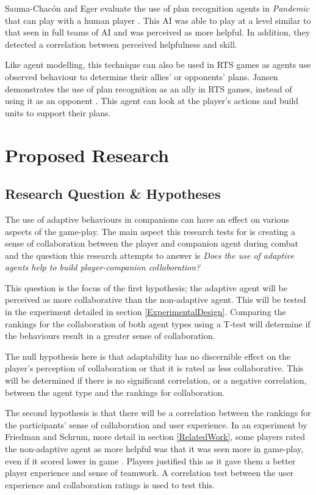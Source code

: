 \documentclass{IEEEtran}
\begin{document}
Sauma-Chacón and Eger evaluate the use of plan recognition agents in \textit{Pandemic} that can play with a human player \cite{PandemicPlanRecognition2021}. This AI was able to play at a level similar to that seen in full teams of AI and was perceived as more helpful. In addition, they detected a correlation between perceived helpfulness and skill.

Like agent modelling, this technique can also be used in RTS games as agents use observed behaviour to determine their allies' or opponents' plans. Jansen demonstrates the use of plan recognition as an ally in RTS games, instead of using it as an opponent \cite{PlayerAdaptiveRTSAI2007}. This agent can look at the player's actions and build units to support their plans.

\section{Proposed Research}
\label{ProposedResearch}

\subsection{Research Question \& Hypotheses}
\label{Hypotheses}

The use of adaptive behaviours in companions can have an effect on various aspects of the game-play. The main aspect this research tests for is creating a sense of collaboration between the player and companion agent during combat and the question this research attempts to answer is \textit{Does the use of adaptive agents help to build player-companion collaboration?}

This question is the focus of the first hypothesis; the adaptive agent will be perceived as more collaborative than the non-adaptive agent. This will be tested in the experiment detailed in section \ref{ExperimentalDesign}. Comparing the rankings for the collaboration of both agent types using a T-test will determine if the behaviours result in a greater sense of collaboration.

The null hypothesis here is that adaptability has no discernible effect on the player's perception of collaboration or that it is rated as less collaborative. This will be determined if there is no significant correlation, or a negative correlation, between the agent type and the rankings for collaboration.

The second hypothesis is that there will be a correlation between the rankings for the participants’ sense of collaboration and user experience. In an experiment by Friedman and Schrum, more detail in section \ref{RelatedWork}, some players rated the non-adaptive agent as more helpful was that it was seen more in game-play, even if it scored lower in game \cite{CompanionBotsFPS2019}. Players justified this as it gave them a better player experience and sense of teamwork. A correlation test between the user experience and collaboration ratings is used to test this.
\end{document}
